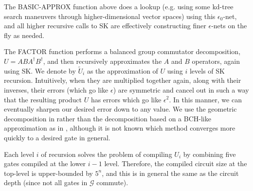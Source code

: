 The BASIC-APPROX function above does a lookup (e.g. using some kd-tree search
maneuvers through higher-dimensional vector spaces) using this $\epsilon_0$-net,
and all higher recursive calls to SK are effectively constructing
finer $\epsilon$-nets on the fly as needed.

The FACTOR function performs a balanced group commutator decomposition,
$U = ABA^\dagger B^\dagger$, and then recursively approximates the $A$ and $B$
operators, again using SK. We denote by $\tilde{U}_i$ as the approximation
of $U$ using $i$ levels of SK recursion. Intuitively, when they are multiplied
together again, along with their inverses, their errors (which go like
$\epsilon$) are symmetric and cancel out in such a way that the resulting
product $U$ has errors which go like $\epsilon^2$. In this manner, we can
eventually sharpen our desired error down to any value. We use the
geometric decomposition in \cite{Dawson2005} rather than the decomposition
based on a BCH-like approximation as in \cite{harrow01}, although it is not
known which method converges more quickly to a desired gate in general.


Each level $i$ of recursion solves the problem of compiling 
$U_i$ by combining five gates compiled at the lower $i-1$ level.
Therefore, the compiled circuit size at the top-level is upper-bounded by $5^n$,
and
this is in general the same as the circuit depth (since not all gates in
$\mathcal{G}$ commute).

